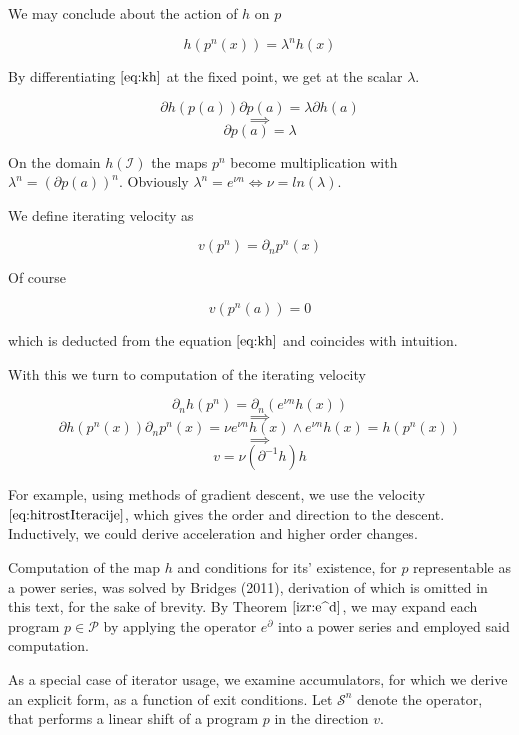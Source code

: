 \documentclass{article}
\newcommand{\Shift}{\mathcal{S}}
\newcommand{\dP}{\mathcal{P}}
\newcommand{\D}{\partial}
\begin{document}
  We may conclude about the action of $h$ on $p$
  
  \begin{equation}
  h(p^n(x))=\lambda^nh(x)
  \end{equation}
  
  By differentiating $\eqref{eq:kh}$ at the fixed point, we get at the scalar $\lambda$.
  
  $$\D h(p(a))\D p(a)=\lambda\D h(a)$$
  $$\implies$$
  $$\D p(a)=\lambda$$
  
  On the domain $h(\mathcal{I})$ the maps $p^n$ become multiplication with $\lambda^n=(\D p(a))^n$. Obviously $\lambda^n=e^{\nu n}\iff \nu=ln(\lambda)$.
  
  We define iterating velocity as
  
  \begin{equation}
  v(p^n)=\D_np^n(x)
  \end{equation}
  
  Of course
  
  \begin{equation}
  v(p^n(a))=0
  \end{equation}
  
  which is deducted from the equation $\eqref{eq:kh}$ and coincides with intuition.
  
  With this we turn to computation of the iterating velocity
 
  $$\D_nh(p^n)=\D_n(e^{\nu n}h(x))$$
  $$\implies$$
  $$\D h(p^n(x))\D_np^n(x)=\nu e^{\nu n}h(x) \land e^{\nu n}h(x)=h(p^n(x))$$
  $$\implies$$
  \begin{equation}\label{eq:hitrostIteracije}
  v=\nu(\D^{-1}h)h
  \end{equation}
  
  For example, using methods of gradient descent, we use the velocity $\eqref{eq:hitrostIteracije}$, which gives the order and direction to the descent. Inductively, we could derive acceleration and higher order changes.
  
  Computation of the map $h$ and conditions for its' existence, for $p$ representable as a power series, was solved by Bridges (2011), derivation of which is omitted in this text, for the sake of brevity. By Theorem $\eqref{izr:e^d}$, we may expand each program $p\in\dP$ by applying the operator $e^\D$ into a power series and employed said computation.
  
  As a special case of iterator usage, we examine accumulators, for which we derive an explicit form, as a function of exit conditions. Let $\Shift^n$ denote the operator, that performs a linear shift of a program $p$ in the direction $v$.
   
\end{document}
